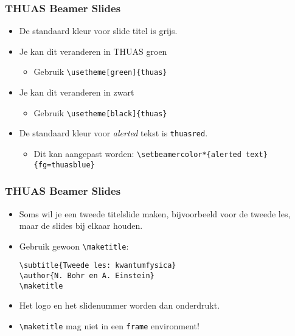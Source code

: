 \documentclass[fleqn,aspectratio=169,dutch,10pt]{beamer}
\begin{document}
\begin{frame}[fragile]
\frametitle{THUAS Beamer Slides}
\begin{itemize}
\item De standaard kleur voor slide titel is grijs.
\item Je kan dit veranderen in THUAS groen
\begin{itemize}
\item Gebruik \lstinline|\usetheme[green]{thuas}|
\end{itemize}
\item Je kan dit veranderen in zwart
\begin{itemize}
\item Gebruik \lstinline|\usetheme[black]{thuas}|
\end{itemize}
\item De standaard kleur voor \emph{alerted} tekst is \lstinline|thuasred|.
\begin{itemize}
\item Dit kan aangepast worden: \lstinline|\setbeamercolor*{alerted text}{fg=thuasblue}|
\end{itemize}
\end{itemize}
\end{frame}


\begin{frame}[fragile]
\frametitle{THUAS Beamer Slides}
\begin{itemize}
\item Soms wil je een tweede titelslide maken, bijvoorbeeld voor de tweede les, maar de slides bij elkaar houden.
\item Gebruik gewoon \lstinline|\maketitle|:
\begin{lstlisting}
\subtitle{Tweede les: kwantumfysica}
\author{N. Bohr en A. Einstein}
\maketitle
\end{lstlisting}
\item Het logo en het slidenummer worden dan onderdrukt.
\item \lstinline|\maketitle| mag niet in een \lstinline|frame| environment!
\end{itemize}
\end{frame}
\end{document}
